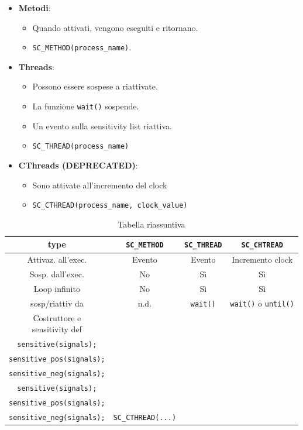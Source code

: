 \documentclass[a4paper]{article}
\theoremstyle{definition}
\begin{document}
			\begin{multicols}{2}
				\begin{itemize}
				\item \textbf{Metodi}: 
				\begin{itemize}
					\item Quando attivati, vengono eseguiti e ritornano. 
					\item \lstinline|SC_METHOD(process_name)|.
				\end{itemize}
				\item \textbf{Threads}: 
				\begin{itemize}
					\item Possono essere sospese a riattivate. 
					\item La funzione \lstinline|wait()| sospende.
					\item Un evento sulla sensitivity list riattiva.
					\item \lstinline|SC_THREAD(process_name)|
				\end{itemize}
				\columnbreak
				\item \textbf{CThreads (DEPRECATED)}:
				\begin{itemize}
					\item Sono attivate all'incremento del clock
					\item \lstinline[basicstyle=\small\ttfamily]|SC_CTHREAD(process_name, clock_value)|
				\end{itemize}
			\end{itemize}
			\end{multicols}
			
			\begin{table}
				\begin{tabular}{cccc}
					\toprule
					\textbf{type} & \lstinline|SC_METHOD| & \lstinline|SC_THREAD| & \lstinline|SC_CHTREAD| \\
					\midrule
					Attivaz. all'exec. & Evento & Evento & Incremento clock \\
					Sosp. dall'exec. & No & Sì & Sì \\
					Loop infinito & No & Sì & Sì\\
					sosp/riattiv da & n.d. & \lstinline|wait()| &  \lstinline|wait()| o \lstinline|until()| \\
					\makecell{Costruttore e\\ sensitivity def} & \makecell{\lstinline|SC_METHOD(call_back);|\\
						\lstinline|sensitive(signals);|\\
						\lstinline|sensitive_pos(signals);|\\
						\lstinline|sensitive_neg(signals);|} &
						\makecell{\lstinline|SC_THREAD(call_back);|\\
							\lstinline|sensitive(signals);|\\
							\lstinline|sensitive_pos(signals);|\\
							\lstinline|sensitive_neg(signals);|} & \lstinline|SC_CTHREAD(...)| \\
					\bottomrule
				\end{tabular}
				\caption{Tabella riassuntiva}
			\end{table}
			
\end{document}
